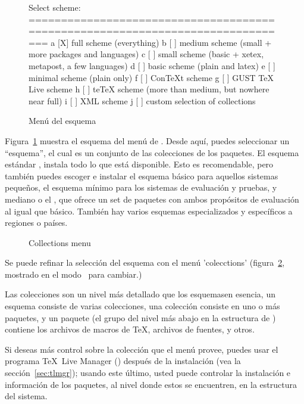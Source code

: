 \documentclass{article}
\begin{document}
\begin{figure}[tbh]
\begin{boxedverbatim}
Select scheme:
===============================================================================
 a [X] full scheme (everything)
 b [ ] medium scheme (small + more packages and languages)
 c [ ] small scheme (basic + xetex, metapost, a few languages)
 d [ ] basic scheme (plain and latex)
 e [ ] minimal scheme (plain only)
 f [ ] ConTeXt scheme
 g [ ] GUST TeX Live scheme
 h [ ] teTeX scheme (more than medium, but nowhere near full)
 i [ ] XML scheme
 j [ ] custom selection of collections
\end{boxedverbatim}
\caption{Menú del esquema}\label{fig:scheme-text}
\end{figure}

Figura~\ref{fig:scheme-text} muestra el esquema del menú de \TL. Desde
aquí, puedes seleccionar un ``esquema'', el cual es un conjunto de las
colecciones de los paquetes. El esquema estándar ,
instala todo lo que está disponible. Esto es recomendable, pero
también puedes escoger e instalar el esquema básico 
para aquellos sistemas pequeños, el esquema mínimo 
para los sistemas de evaluación y pruebas, y mediano  o
el , que ofrece un set de paquetes con ambos propósitos
de evaluación al igual que básico. También hay varios esquemas
especializados y específicos a regiones o países.

\begin{figure}[tb]
\centering {}
\caption{Collections menu}\label{fig:collections-gui}
\end{figure}

Se puede refinar la selección del esquema con el menú 'colecctions'
(figura~\ref{fig:collections-gui}, mostrado en el modo \GUI\, para
cambiar.)

Las colecciones son un nivel más detallado que los esquemas\Dash en
esencia, un esquema consiste de varias colecciones, una colección
consiste en uno o más paquetes, y un paquete (el grupo del nivel más
abajo en la estructura de \TL) contiene los archivos de macros de
\TeX{}, archivos de fuentes, y otros.

Si deseas más control sobre la colección que el menú provee, puedes
usar el programa \TeX\ Live Manager () después de la
instalación (vea la sección~\ref{sec:tlmgr}); usando este último,
usted puede controlar la instalación e información de los paquetes, al
nivel donde estos se encuentren, en la estructura del sistema.
\end{document}

